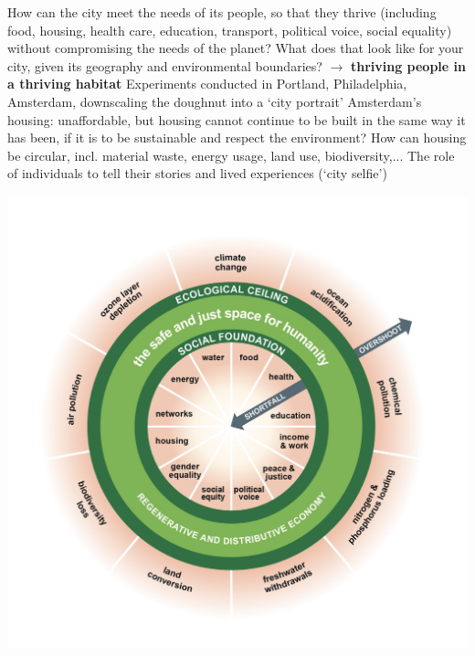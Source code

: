 \documentclass{article}
\begin{document}
\begin{outline}
	\1 How can the city meet the needs of its people, so that they thrive (including food, housing, health care, education, transport, political voice, social equality) without compromising the needs of the planet? What does that look like for your city, given its geography and environmental boundaries? $\rightarrow$ \textbf{thriving people in a thriving habitat}
	\1	Experiments conducted in Portland, Philadelphia, Amsterdam, downscaling the doughnut into a `city portrait'
		\2 Amsterdam's housing: unaffordable, but housing cannot continue to be built in the same way it has been, if it is to be sustainable and respect the environment? How can housing be circular, incl. material waste, energy usage, land use, biodiversity,... 
	\1 The role of individuals to tell their stories and lived experiences (`city selfie')
\end{outline}

\includegraphics[width=\textwidth]{doughnut_economics}

\printbibliography
\end{document}
